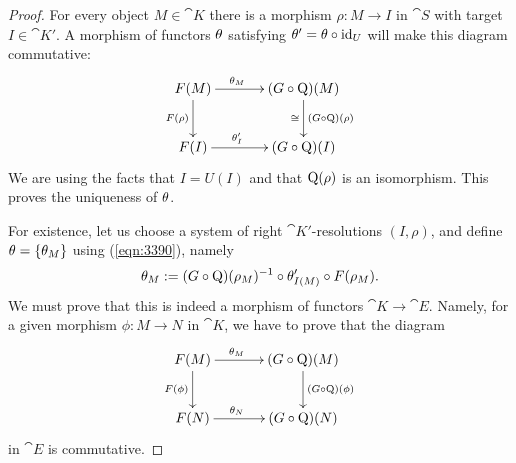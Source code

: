 \begin{proof}
For every object $M \in \cat{K}$ there is a morphism 
$\rho : M \to I$ in $\cat{S}$ with target $I \in \cat{K}'$. 
A morphism of functors $\theta$ satisfying $\theta' = \theta \circ \operatorname{id}_{U}$
will make this diagram commutative:
\begin{equation} \label{eqn:3390}
\UseTips  \xymatrix @C=8ex @R=6ex {
F(M)
\ar[r]^(0.4){\th_M}
\ar[d]_{F(\rho)}
&
(G \circ \opn{Q})(M)
\ar[d]^{(G \circ \opn{Q})(\rho)}_{\cong}
\\
F(I)
\ar[r]^(0.4){\th'_I}
&
(G \circ \opn{Q})(I)
} 
\end{equation}
We are using the facts that $I = U(I)$ and that $\operatorname{Q}(\rho)$ is an 
isomorphism. This proves the uniqueness of $\theta$. 

For existence, let us choose a system  of right $\cat{K}'$-resolutions 
$(I, \rho)$, and define $\theta = \{ \theta_M \}$ using (\ref{eqn:3390}), namely 
\begin{equation} \label{eqn:3394}
\theta_M := (G \circ \operatorname{Q})(\rho_M)^{-1} \circ \theta'_{I(M)} \circ 
F(\rho_M) .
\end{equation}
We must prove that this is indeed a morphism of functors 
$\cat{K} \to \cat{E}$. Namely, for a given morphism 
$\phi : M \to N$ in $\cat{K}$, we have to prove that the diagram 
\begin{equation} \label{eqn:3391}
\UseTips  \xymatrix @C=8ex @R=6ex {
F(M)
\ar[r]^(0.4){\th_M}
\ar[d]_{F(\phi)}
&
(G \circ \opn{Q})(M)
\ar[d]^{(G \circ \opn{Q})(\phi)}
\\
F(N)
\ar[r]^(0.4){\th_N}
&
(G \circ \opn{Q})(N)
}
\end{equation}
in $\cat{E}$ is commutative. 


\end{proof}
